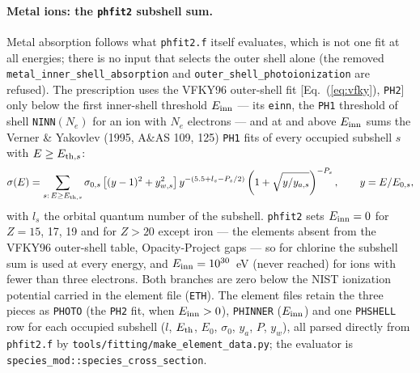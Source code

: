 \documentclass[english,a4paper]{my_memo}
\newcommand{\code}[1]{\texttt{#1}}
\begin{document}
\paragraph{Metal ions: the \code{phfit2} subshell sum.}  Metal absorption
follows what \code{phfit2.f} itself evaluates, which is not one fit at all
energies; there is no input that selects the outer shell alone (the removed
\code{metal\_inner\_shell\_absorption} and \code{outer\_shell\_photoionization}
are refused).  The prescription uses the VFKY96 outer-shell
fit [Eq.~(\ref{eq:vfky}), \code{PH2}] only below the first inner-shell
threshold $E_{\rm inn}$ --- its \code{einn}, the \code{PH1} threshold of
shell \code{NINN}$(N_e)$ for an ion with $N_e$ electrons --- and at and
above $E_{\rm inn}$ sums the Verner \& Yakovlev (1995, A\&AS 109, 125)
\code{PH1} fits of every occupied subshell $s$ with $E \ge E_{{\rm th},s}$:
\begin{equation}
  \sigma(E) = \sum_{s:\,E \ge E_{{\rm th},s}} \sigma_{0,s}
  \left[(y-1)^2 + y_{w,s}^2\right] y^{-(5.5 + l_s - P_s/2)}
  \left(1 + \sqrt{y/y_{a,s}}\right)^{-P_s},
  \qquad y = E/E_{0,s},
  \label{eq:vy95}
\end{equation}
with $l_s$ the orbital quantum number of the subshell.  \code{phfit2} sets
$E_{\rm inn} = 0$ for $Z = 15$, 17, 19 and for $Z > 20$ except iron ---
the elements absent from the VFKY96 outer-shell table, Opacity-Project
gaps --- so for chlorine the subshell sum is used at every energy, and
$E_{\rm inn} = 10^{30}$~eV (never reached) for ions with fewer than three
electrons.  Both branches are zero below the NIST ionization potential
carried in the element file (\code{ETH}).  The element files retain the
three pieces as \code{PHOTO} (the \code{PH2} fit, when $E_{\rm inn} > 0$),
\code{PHINNER} ($E_{\rm inn}$) and one \code{PHSHELL} row for each
occupied subshell ($l$, $E_{\rm th}$, $E_0$, $\sigma_0$, $y_a$, $P$,
$y_w$), all parsed directly from \code{phfit2.f} by
\code{tools/fitting/make\_element\_data.py}; the evaluator is
\code{species\_mod::species\_cross\_section}.
\end{document}
